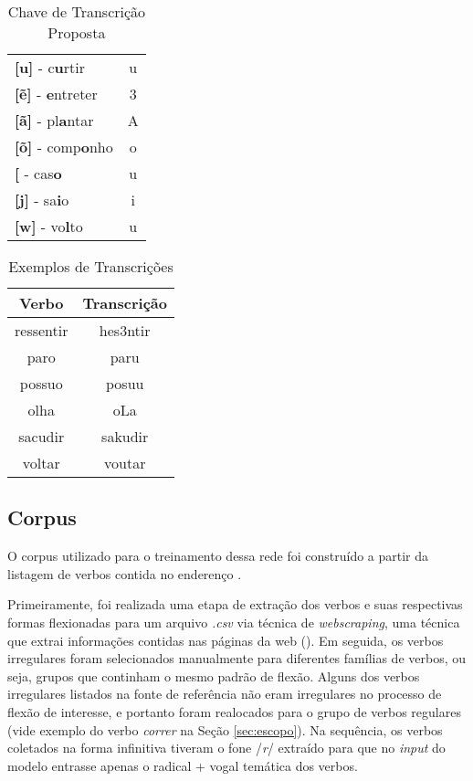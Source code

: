 \begin{table}[H]
\begin{center}
\begin{tabular}{lc}
\textbf{{[}u{]}} - c\textbf{u}rtir & u \\
\textbf{{[}\~e{]}} - \textbf{e}ntreter & 3 \\
\textbf{{[}ã{]}} - pl\textbf{a}ntar & A \\
\textbf{{[}\~o{]}} - comp\textbf{o}nho & o \\
\textbf{{[}\textupsilon{]}} - cas\textbf{o} & u \\
\textbf{{[}j{]}} - sa\textbf{i}o & i \\
\textbf{{[}w{]}} - vo\textbf{l}to & u
\end{tabular}
\end{center}
\caption{Chave de Transcrição Proposta}
\label{tab:chave}
\end{table}

\begin{table}[H]
\begin{center}
\begin{tabular}{cc}
\hline
\textbf{Verbo} & \textbf{Transcrição} \\ \hline
ressentir & hes3ntir \\
paro & paru \\
possuo & posuu \\
olha & oLa \\
sacudir & sakudir \\
voltar & voutar \\ \hline
\end{tabular}
\end{center}
\caption{Exemplos de Transcrições}
\label{tab:transc}
\end{table}



\subsection{Corpus}

O corpus utilizado para o treinamento dessa rede foi construído a partir da listagem de verbos contida no enderenço .

Primeiramente, foi realizada uma etapa de extração dos verbos e suas respectivas formas flexionadas para um arquivo \textit{.csv} via técnica de \textit{webscraping}, uma técnica que extrai informações contidas nas páginas da web (\cite{mitchell:2015}). Em seguida, os verbos irregulares foram selecionados manualmente para diferentes famílias de verbos, ou seja, grupos que continham o mesmo padrão de flexão. Alguns dos verbos irregulares listados na fonte de referência não eram irregulares no processo de flexão de interesse, e portanto foram realocados para o grupo de verbos regulares (vide exemplo do verbo \textit{correr} na Seção \ref{sec:escopo}). Na sequência, os verbos  coletados na forma infinitiva tiveram o fone /\textit{r}/ extraído para que no \textit{input} do modelo entrasse apenas o radical + vogal temática dos verbos.

